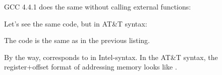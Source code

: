 
GCC 4.4.1 does the same without calling external functions:




Let's see the same code, but in AT\&T syntax:



\myindex{\ATTSyntax}
The code is the same as in the previous listing.

By the way,  corresponds to
 in Intel-syntax.
In the AT\&T syntax, the register+offset format of addressing memory looks like
.

